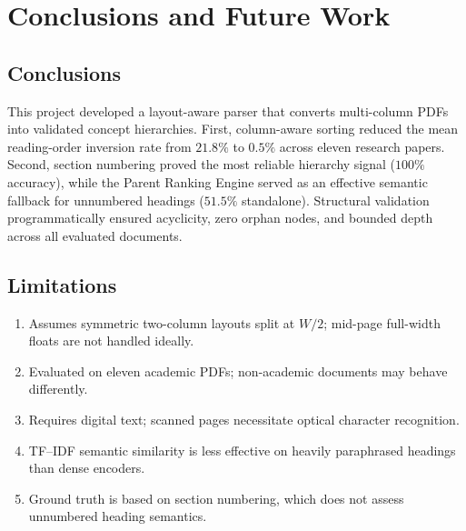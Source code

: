 \documentclass[12pt,a4paper,twoside,openright]{report}
\begin{document}
\chapter{Conclusions and Future Work}
\vspace{-2mm}

\section{Conclusions}
This project developed a layout-aware parser that converts multi-column PDFs into validated
concept hierarchies. First, column-aware sorting reduced the mean reading-order inversion
rate from $21.8\%$ to $0.5\%$ across eleven research papers. Second, section numbering
proved the most reliable hierarchy signal ($100\%$ accuracy), while the Parent Ranking
Engine served as an effective semantic fallback for unnumbered headings ($51.5\%$ standalone).
Structural validation programmatically ensured acyclicity, zero orphan nodes, and bounded
depth across all evaluated documents.

\section{Limitations}
\begin{enumerate}\setlength{\itemsep}{1pt}\setlength{\parskip}{0pt}\setlength{\parsep}{0pt}
  \item Assumes symmetric two-column layouts split at $W/2$; mid-page full-width floats are not handled ideally.
  \item Evaluated on eleven academic PDFs; non-academic documents may behave differently.
  \item Requires digital text; scanned pages necessitate optical character recognition.
  \item TF--IDF semantic similarity is less effective on heavily paraphrased headings than dense encoders.
  \item Ground truth is based on section numbering, which does not assess unnumbered heading semantics.
\end{enumerate}
\end{document}
